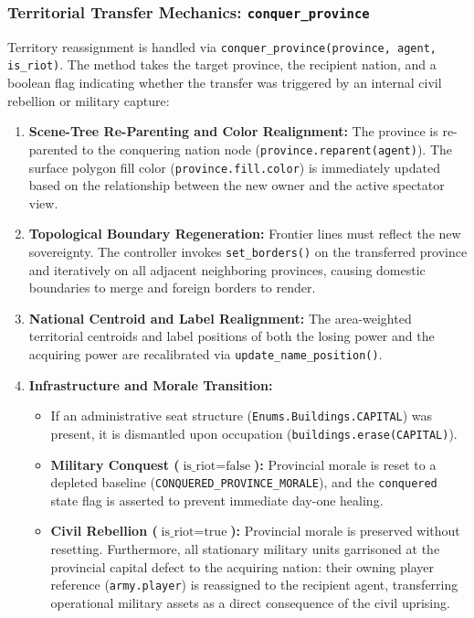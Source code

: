 \subsubsection{Territorial Transfer Mechanics: \texttt{conquer\_province}}
Territory reassignment is handled via \texttt{conquer\_province(province, agent, is\_riot)}. The method takes the target province, the recipient nation, and a boolean flag indicating whether the transfer was triggered by an internal civil rebellion or military capture:

\begin{enumerate}
    \item \textbf{Scene-Tree Re-Parenting and Color Realignment:} The province is re-parented to the conquering nation node (\texttt{province.reparent(agent)}). The surface polygon fill color (\texttt{province.fill.color}) is immediately updated based on the relationship between the new owner and the active spectator view.
    \item \textbf{Topological Boundary Regeneration:} Frontier lines must reflect the new sovereignty. The controller invokes \texttt{set\_borders()} on the transferred province and iteratively on all adjacent neighboring provinces, causing domestic boundaries to merge and foreign borders to render.
    \item \textbf{National Centroid and Label Realignment:} The area-weighted territorial centroids and label positions of both the losing power and the acquiring power are recalibrated via \texttt{update\_name\_position()}.
    \item \textbf{Infrastructure and Morale Transition:}
    \begin{itemize}
        \item If an administrative seat structure (\texttt{Enums.Buildings.CAPITAL}) was present, it is dismantled upon occupation (\texttt{buildings.erase(CAPITAL)}).
        \item \textbf{Military Conquest ($\text{is\_riot} = \text{false}$):} Provincial morale is reset to a depleted baseline (\texttt{CONQUERED\_PROVINCE\_MORALE}), and the \texttt{conquered} state flag is asserted to prevent immediate day-one healing.
        \item \textbf{Civil Rebellion ($\text{is\_riot} = \text{true}$):} Provincial morale is preserved without resetting. Furthermore, all stationary military units garrisoned at the provincial capital defect to the acquiring nation: their owning player reference (\texttt{army.player}) is reassigned to the recipient agent, transferring operational military assets as a direct consequence of the civil uprising.

\end{itemize}
\end{enumerate}
